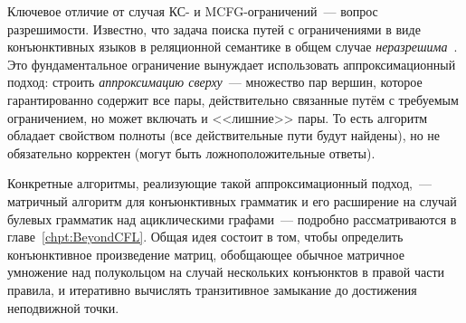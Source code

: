 Ключевое отличие от случая КС- и MCFG-ограничений~--- вопрос разрешимости.
Известно, что задача поиска путей с ограничениями в виде конъюнктивных языков в реляционной семантике в общем случае \emph{неразрешима}~.
Это фундаментальное ограничение вынуждает использовать аппроксимационный подход: строить \emph{аппроксимацию сверху}~--- множество пар вершин, которое гарантированно содержит все пары, действительно связанные путём с требуемым ограничением, но может включать и <<лишние>> пары.
То есть алгоритм обладает свойством полноты (все действительные пути будут найдены), но не обязательно корректен (могут быть ложноположительные ответы).

Конкретные алгоритмы, реализующие такой аппроксимационный подход,~--- матричный алгоритм для конъюнктивных грамматик и его расширение на случай булевых грамматик над ациклическими графами~--- подробно рассматриваются в главе~\ref{chpt:BeyondCFL}.
Общая идея состоит в том, чтобы определить конъюнктивное произведение матриц, обобщающее обычное матричное умножение над полукольцом на случай нескольких конъюнктов в правой части правила, и итеративно вычислять транзитивное замыкание до достижения неподвижной точки.
